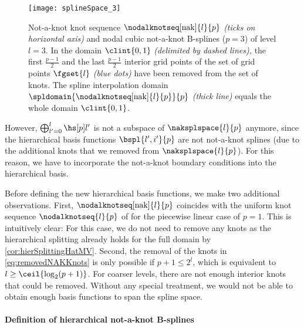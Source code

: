 \begin{figure}
  \texttt{[image: splineSpace\_3]}%
  \caption[%
    Nodal not-a-knot B-splines and knot sequence%
  ]{%
    Not-a-knot knot sequence $\nodalknotseq[\nak]{l}{p}$
    \emph{(ticks on horizontal axis)}
    and nodal cubic not-a-knot B-splines ($p = 3$)
    of level $l = 3$.
    In the domain $\clint{0, 1}$ \emph{(delimited by dashed lines),}
    the first $\tfrac{p-1}{2}$ and the last $\tfrac{p-1}{2}$ interior grid points
    of the set of grid points $\fgset{l}$
    \emph{\textcolor{mittelblau}{(blue dots)}}
    have been removed from the set of knots.
    The spline interpolation domain
    $\spldomain{\nodalknotseq[\nak]{l}{p}}{p}$
    \emph{(thick line)}
    equals the whole domain $\clint{0, 1}$.%
  }%
  \label{fig:splineSpaceNotAKnot}%
\end{figure}

\vspace*{\fill}

However, $\bigoplus_{l'=0}^l \hsbspl{l'}{p}$ is not a subspace of
$\naksplspace{l}{p}$ anymore,
since the hierarchical basis functions $\bspl{l',i'}{p}$ are not
not-a-knot splines (due to the additional knots that we removed from
$\naksplspace{l}{p}$).
For this reason,
we have to incorporate the not-a-knot boundary conditions into the
hierarchical basis.

\vspace*{\fill}

Before defining the new hierarchical basis functions,
we make two additional observations.
First, $\nodalknotseq[\nak]{l}{p}$ coincides with the
uniform knot sequence $\nodalknotseq{l}{p}$ of 
for the piecewise linear case of $p = 1$.
This is intuitively clear:
For this case,
we do not need to remove any knots as the hierarchical splitting already
holds for the full domain by \cref{cor:hierSplittingHatMV}.
Second, the removal of the knots in \eqref{eq:removedNAKKnots}
is only possible if $p + 1 \le 2^l$,
which is equivalent to $l \ge \ceil{\log_2(p+1)}$.
For coarser levels,
there are not enough interior knots that could be removed.
Without any special treatment,
we would not be able to obtain enough basis functions to span the spline space.

\pagebreak

\paragraph{Definition of hierarchical not-a-knot B-splines}

